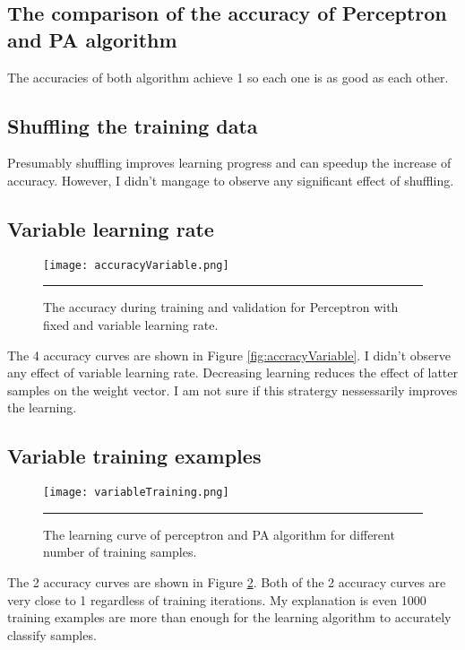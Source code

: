 \documentclass[12pt]{article}
\begin{document}
\subsection{The comparison of the accuracy of Perceptron and PA algorithm}
The accuracies of both algorithm achieve 1 so each one is as good as each other.
\subsection{Shuffling the training data}
Presumably shuffling improves learning progress and can speedup the increase of accuracy. However, I didn't mangage to observe any significant effect of shuffling.
\subsection{Variable learning rate}
\begin{figure}[htb]
  \centering
      {\texttt{[image: accuracyVariable.png]}} \rule{1\linewidth}{1pt}
      \caption{The accuracy during training and validation for Perceptron with fixed and variable learning rate.}
      \label{fig:accuracyVariable}
\end{figure}
The 4 accuracy curves are shown in Figure \ref{fig:accracyVariable}. I didn't observe any effect of variable learning rate. Decreasing learning reduces the effect of latter samples on the weight vector. I am not sure if this stratergy nessessarily improves the learning.
\subsection{Variable training examples}
\begin{figure}[htb]
  \centering
      {\texttt{[image: variableTraining.png]}} \rule{1\linewidth}{1pt}
      \caption{The learning curve of perceptron and PA algorithm for different number of training samples.}
      \label{fig:variableTraining}
\end{figure}
The 2 accuracy curves are shown in Figure \ref{fig:variableTraining}. Both of the 2 accuracy curves are very close to 1 regardless of training iterations. My explanation is even 1000 training examples are more than enough for the learning algorithm to accurately classify samples.
\end{document}
